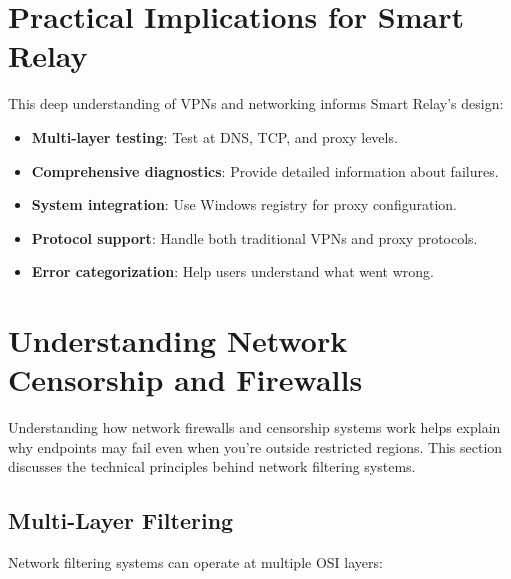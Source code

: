 \section{Practical Implications for Smart Relay}

This deep understanding of VPNs and networking informs Smart Relay's design:

\begin{itemize}
    \item \textbf{Multi-layer testing}: Test at DNS, TCP, and proxy levels.
    \item \textbf{Comprehensive diagnostics}: Provide detailed information about failures.
    \item \textbf{System integration}: Use Windows registry for proxy configuration.
    \item \textbf{Protocol support}: Handle both traditional VPNs and proxy protocols.
    \item \textbf{Error categorization}: Help users understand what went wrong.
\end{itemize}

\section{Understanding Network Censorship and Firewalls}

Understanding how network firewalls and censorship systems work helps explain why endpoints may fail even when you're outside restricted regions. This section discusses the technical principles behind network filtering systems.

\subsection{Multi-Layer Filtering}

Network filtering systems can operate at multiple OSI layers:

